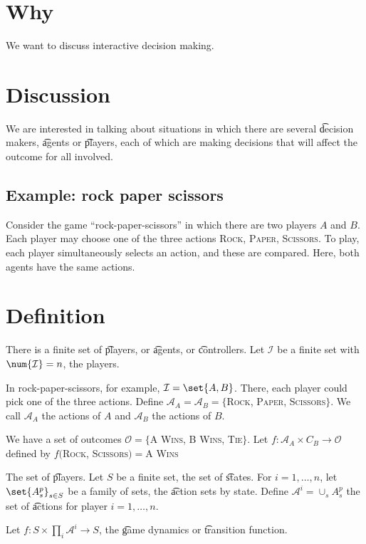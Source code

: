 
\section*{Why}

We want to discuss interactive decision making.

\section*{Discussion}

We are interested in talking about situations in which there are several \t{decision makers}, \t{agents} or \t{players}, each of which are making decisions that will affect the outcome for all involved.

\subsection*{Example: rock paper scissors}

Consider the game ``rock-paper-scissors'' in which there are two players $A$ and $B$.
Each player may choose one of the three actions \textsc{Rock}, \textsc{Paper}, \textsc{Scissors}.
To play, each player simultaneously selects an action, and these are compared.
Here, both agents have the same actions.

\section*{Definition}

There is a finite set of \t{players}, or \t{agents}, or \t{controllers}.
Let $\mathcal{I} $ be a finite set with $\num{\mathcal{I} } = n$, the players.

In rock-paper-scissors, for example, $\mathcal{I}  = \set{A, B}$.
There, each player could pick one of the three actions.
Define $\mathcal{A} _A = \mathcal{A} _B = \{$\textsc{Rock}, \textsc{Paper}, \textsc{Scissors}$\}$.
We call $\mathcal{A} _A$ the actions of $A$ and $\mathcal{A} _B$ the actions of $B$.

We have a set of outcomes $\mathcal{O} = \{$\textsc{A Wins}, \textsc{B Wins}, \textsc{Tie}$\}$.
Let $f: \mathcal{A} _A \times C_B \to \mathcal{O}$ defined by $f($\textsc{Rock}, \textsc{Scissors}$) = $\textsc{A Wins}

The set of \t{players}.
Let $S$ be a finite set, the set of \t{states}.
For $i = 1, \dots , n$, let $\set{A^p_s}_{s \in S}$ be a family of sets, the \t{action sets by state}.
Define $\mathcal{A} ^i = \cup_s A^p_s$ the set of \t{actions} for player $i = 1, \dots , n$.

Let $f: S \times  \prod_{i} \mathcal{A} ^i \to S$, the \t{game dynamics} or \t{transition function}.

\blankpage